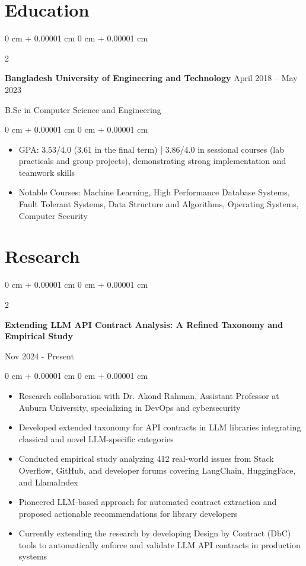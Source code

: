 \documentclass[10pt, letterpaper]{article}
\newenvironment{highlights}{
    \begin{itemize}[
        topsep=0.10 cm,
        parsep=0.10 cm,
        partopsep=0pt,
        itemsep=0pt,
        leftmargin=0 cm + 10pt
    ]
}{
    \end{itemize}
} %
\newenvironment{onecolentry}{
    \begin{adjustwidth}{
        0 cm + 0.00001 cm
    }{
        0 cm + 0.00001 cm
    }
}{
    \end{adjustwidth}
} %
\newenvironment{twocolentry}[2][]{
    \onecolentry
    \def\secondColumn{#2}
    \setcolumnwidth{\fill, 4.5 cm}
    \begin{paracol}{2}
}{
    \switchcolumn \raggedleft \secondColumn
    \end{paracol}
    \endonecolentry
} %
\begin{document}
        \vspace{0.2 cm}
    
    \section{Education}
 
        \begin{twocolentry}{
            April 2018 – May 2023
        }
            \textbf{Bangladesh University of Engineering and Technology}\end{twocolentry}
        B.Sc in Computer Science and Engineering


        \vspace{0.10 cm}
        \begin{onecolentry}
            \begin{highlights}
                \item GPA: 3.53/4.0 (3.61 in the final term) | 3.86/4.0 in sessional courses (lab practicals and group projects), demonstrating strong implementation and teamwork skills
                \item Notable Courses: Machine Learning, High Performance Database Systems, Fault Tolerant Systems, Data Structure and Algorithms, Operating Systems, Computer Security
                \end{highlights}
        \end{onecolentry}
                
        
    \section{Research}

\begin{twocolentry}{
    Nov 2024 - Present
}

\textbf{Extending LLM API Contract Analysis: A Refined Taxonomy and Empirical Study}
    
\end{twocolentry}



\begin{onecolentry}
    \begin{highlights}
        \item Research collaboration with Dr. Akond Rahman, Assistant Professor at Auburn University, specializing in DevOps and cybersecurity
        \item Developed extended taxonomy for API contracts in LLM libraries integrating classical and novel LLM-specific categories
        \item Conducted empirical study analyzing 412 real-world issues from Stack Overflow, GitHub, and developer forums covering LangChain, HuggingFace, and LlamaIndex
        \item Pioneered LLM-based approach for automated contract extraction and proposed actionable recommendations for library developers
        \item Currently extending the research by developing Design by Contract (DbC) tools to automatically enforce and validate LLM API contracts in production systems
    \end{highlights}
\end{onecolentry}
\end{document}
